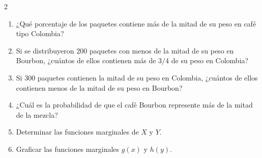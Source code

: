 \documentclass[10pt,letterpaper]{article}
\begin{document}
\begin{multicols}{2}
\begin{enumerate}
\item ¿Qué porcentaje de los paquetes contiene más de la mitad de su peso en
café tipo Colombia?
\item Si se distribuyeron 200 paquetes con menos de la mitad de su peso en
Bourbon, ¿cuántos de ellos contienen más de \(3/4\) de su peso en Colombia?
\item Si 300 paquetes contienen la mitad de su peso en Colombia, ¿cuántos de
ellos contienen menos de la mitad de su peso en Bourbon?
\item ¿Cuál es la probabilidad de que el café Bourbon represente más de la
mitad de la mezcla?
\item Determinar las funciones marginales de \(X\) y \(Y\).
\item Graficar las funciones marginales \(g(x)\) y \(h(y)\).
\end{enumerate}

\end{multicols}
\end{document}
